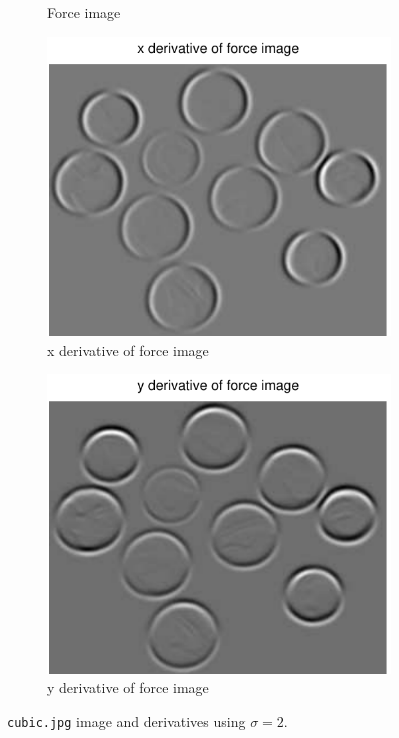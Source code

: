 \documentclass[11pt,a4paper]{article}
\begin{document}
\begin{figure}[H]
\begin{subfigure}[t]{0.48\textwidth}
        \caption{Force image}
        \label{fig:coins_forces}
    \end{subfigure}
    \begin{subfigure}[t]{0.48\textwidth}
        \includegraphics[width=\textwidth]{src/images/coins_gradient_xforces.pdf}
        \caption{x derivative of force image}
        \label{fig:coins_fx}
    \end{subfigure}
    \begin{subfigure}[t]{0.48\textwidth}
        \includegraphics[width=\textwidth]{src/images/coins_gradient_yforces.pdf}
        \caption{y derivative of force image}
        \label{fig:coins_fy}
    \end{subfigure}
    \caption{\texttt{cubic.jpg} image and derivatives using $\sigma = 2$.}
    \label{fig:coins}
\end{figure}
\end{document}
